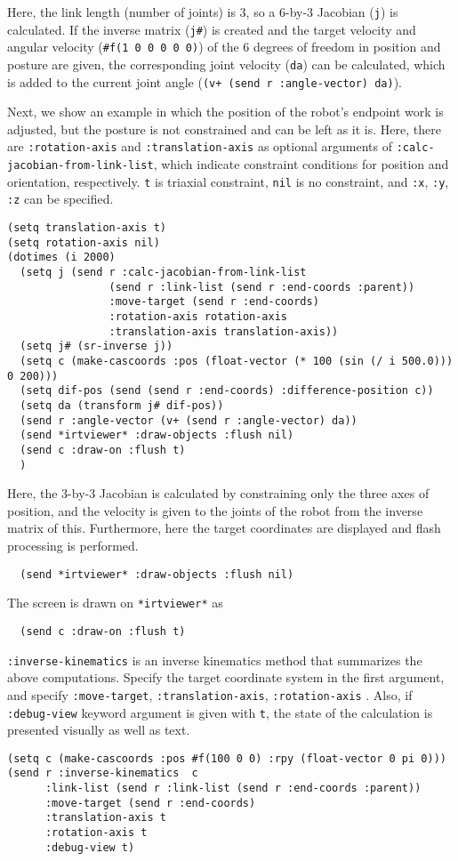 Here, the link length (number of joints) is 3, so a 6-by-3 Jacobian (\verb|j|) is calculated. If the inverse matrix (\verb|j#|) is created and the target velocity and angular velocity (\verb|#f(1 0 0 0 0 0)|) of the 6 degrees of freedom in position and posture are given, the corresponding joint velocity (\verb|da|) can be calculated, which is added to the current joint angle (\verb|(v+ (send r :angle-vector) da)|).

Next, we show an example in which the position of the robot's endpoint work is adjusted, but the posture is not constrained and can be left as it is. Here, there are \verb|:rotation-axis| and \verb|:translation-axis| as optional arguments of \verb|:calc-jacobian-from-link-list|, which indicate constraint conditions for position and orientation, respectively.
\verb|t| is triaxial constraint, \verb|nil| is no constraint, and \verb|:x|, \verb|:y|, \verb|:z| can be specified.

{\baselineskip=10pt
\begin{verbatim}
(setq translation-axis t)
(setq rotation-axis nil)
(dotimes (i 2000)
  (setq j (send r :calc-jacobian-from-link-list
                (send r :link-list (send r :end-coords :parent))
                :move-target (send r :end-coords)
                :rotation-axis rotation-axis
                :translation-axis translation-axis))
  (setq j# (sr-inverse j))
  (setq c (make-cascoords :pos (float-vector (* 100 (sin (/ i 500.0))) 0 200)))
  (setq dif-pos (send (send r :end-coords) :difference-position c))
  (setq da (transform j# dif-pos))
  (send r :angle-vector (v+ (send r :angle-vector) da))
  (send *irtviewer* :draw-objects :flush nil)
  (send c :draw-on :flush t)
  )
\end{verbatim}
}

Here, the 3-by-3 Jacobian is calculated by constraining only the three axes of position, and the velocity is given to the joints of the robot from the inverse matrix of this. Furthermore, here the target coordinates are displayed and flash processing is performed.
{\baselineskip=10pt
\begin{verbatim}
  (send *irtviewer* :draw-objects :flush nil)
\end{verbatim}
}
The screen is drawn on \verb|*irtviewer*| as
{\baselineskip=10pt
\begin{verbatim}
  (send c :draw-on :flush t)
\end{verbatim}
}


\verb|:inverse-kinematics| is an inverse kinematics method that summarizes the above computations.
Specify the target coordinate system in the first argument, and specify \verb|:move-target|, \verb|:translation-axis|, \verb|:rotation-axis| .
Also, if \verb|:debug-view| keyword argument is given with \verb|t|, the state of the calculation is presented visually as well as text.
{\baselineskip=10pt
\begin{verbatim}
(setq c (make-cascoords :pos #f(100 0 0) :rpy (float-vector 0 pi 0)))
(send r :inverse-kinematics  c
      :link-list (send r :link-list (send r :end-coords :parent))
      :move-target (send r :end-coords)
      :translation-axis t
      :rotation-axis t
      :debug-view t)
\end{verbatim}
}

